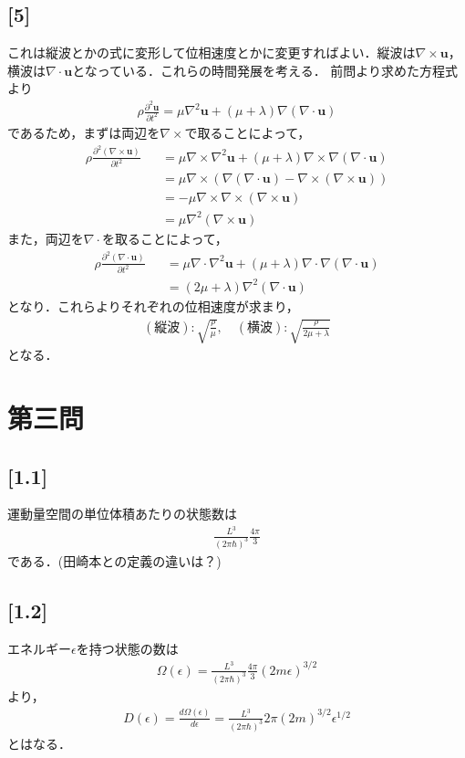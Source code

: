 \documentclass[12pt,dvipdfmx]{jsarticle}
\begin{document}
\subsection*{\large{[5]}}
これは縦波とかの式に変形して位相速度とかに変更すればよい．縦波は$\nabla\times\bm{u}$，横波は$\nabla\cdot\bm{u}$となっている．これらの時間発展を考える．
前問より求めた方程式より
\begin{eqnarray}
  \rho\frac{\partial^2 \bm{u}}{\partial t^2} = \mu\nabla^2\bm{u} + (\mu+\lambda)\nabla(\nabla\cdot\bm{u})
\end{eqnarray}
であるため，まずは両辺を$\nabla\times$で取ることによって，
\begin{eqnarray}
  \rho\frac{\partial^2 (\nabla\times\bm{u})}{\partial t^2} &&= \mu\nabla\times\nabla^2\bm{u} +  (\mu+\lambda) \nabla\times\nabla(\nabla\cdot\bm{u})\\
  &&=\mu\nabla\times \left( \nabla(\nabla\cdot\bm{u}) - \nabla\times(\nabla\times\bm{u}) \right)\\
  &&=- \mu\nabla\times \nabla\times(\nabla\times\bm{u})\\
  &&= \mu\nabla^2 (\nabla\times\bm{u})
\end{eqnarray}
また，両辺を$\nabla\cdot$を取ることによって，
\begin{eqnarray}
  \rho\frac{\partial^2 (\nabla\cdot\bm{u})}{\partial t^2} &&= \mu\nabla\cdot\nabla^2 \bm{u} + (\mu+\lambda)\nabla\cdot\nabla(\nabla\cdot\bm{u})\\
  &&= ( 2\mu+\lambda )\nabla^2(\nabla\cdot\bm{u})
\end{eqnarray}
となり．これらよりそれぞれの位相速度が求まり，
\begin{eqnarray}
  (縦波):\sqrt{\frac{\rho}{\mu}}, \quad (横波): \sqrt{\frac{\rho}{2\mu+\lambda}}
\end{eqnarray}
となる．

\newpage

\section*{\Large{第三問}}
\subsection*{\large{[1.1]}}
運動量空間の単位体積あたりの状態数は
\begin{eqnarray}
  \frac{L^3}{(2\pi\hbar)^3}\frac{4\pi}{3}
\end{eqnarray}
である．(田崎本との定義の違いは？)

\subsection*{\large{[1.2]}}
エネルギー$\epsilon$を持つ状態の数は
\begin{eqnarray}
  \Omega(\epsilon) = \frac{L^3}{(2\pi\hbar)^3}\frac{4\pi}{3}(2m\epsilon)^{3/2 }
\end{eqnarray}
より，
\begin{eqnarray}
  D(\epsilon)= \frac{d\Omega(\epsilon)}{d\epsilon} = \frac{L^3}{(2\pi\hbar)^3}2\pi (2m)^{3/2}\epsilon^{1/2}
\end{eqnarray}
とはなる．
\end{document}

